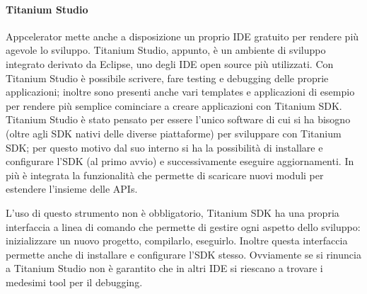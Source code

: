             \paragraph{Titanium Studio}
                Appcelerator mette anche a disposizione un proprio IDE gratuito
                per rendere più agevole lo sviluppo. Titanium Studio, appunto, è
                un ambiente di sviluppo integrato derivato da Eclipse, uno degli
                IDE open \mbox{source} più utilizzati. Con Titanium Studio è possibile
                scrivere, fare testing e debugging delle proprie applicazioni;
                inoltre sono presenti anche vari templates e applicazioni di
                esempio per rendere più semplice cominciare a creare
                applicazioni con Titanium SDK. Titanium Studio è stato
                pensato per essere l'unico software di cui si ha bisogno (oltre
                agli SDK nativi delle diverse piattaforme) per
                sviluppare con Titanium SDK; per questo motivo dal suo interno
                si ha la possibilità di installare e configurare l'SDK (al primo
                avvio) e successivamente eseguire aggiornamenti. In più è
                integrata la funzionalità che permette di scaricare nuovi moduli
                per estendere l'insieme delle APIs.

                L'uso di questo strumento non è obbligatorio, Titanium SDK
                ha una propria interfaccia a linea di comando che permette di
                gestire ogni aspetto dello sviluppo: inizializzare un
                nuovo progetto, compilarlo, eseguirlo. Inoltre questa
                interfaccia permette anche di
                installare e configurare l'SDK stesso.
                Ovviamente se si rinuncia a Titanium Studio non è garantito che
                in altri IDE si riescano a trovare i medesimi tool per il
                debugging.

